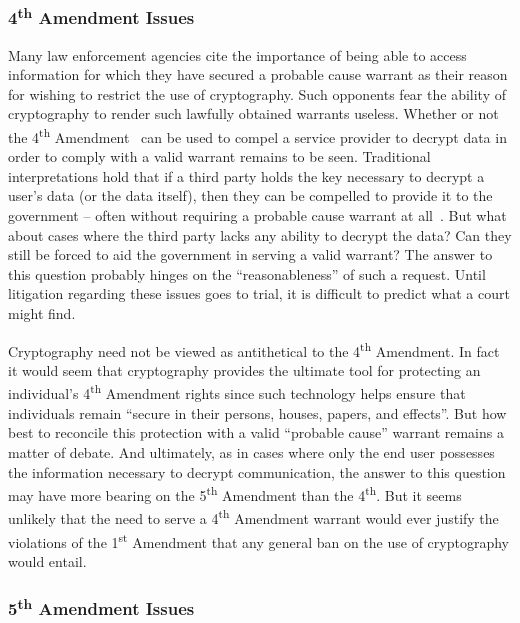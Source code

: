\subsubsection{4\textsuperscript{th} Amendment Issues}

Many law enforcement agencies cite the importance of being able to
access information for which they have secured a probable cause
warrant as their reason for wishing to restrict the use of
cryptography. Such opponents fear the ability of cryptography to
render such lawfully obtained warrants useless. Whether or not the
4\textsuperscript{th} Amendment~\cite{us-constitution-amend4} can be
used to compel a service provider to decrypt data in order to comply
with a valid warrant remains to be seen. Traditional interpretations
hold that if a third party holds the key necessary to decrypt a user's
data (or the data itself), then they can be compelled to provide it to
the government -- often without requiring a probable cause warrant at
all~\cite{thompson-thirdparty}. But what about cases where the third
party lacks any ability to decrypt the data? Can they still be forced
to aid the government in serving a valid warrant?  The answer to this
question probably hinges on the ``reasonableness'' of such a
request. Until litigation regarding these issues goes to trial, it is
difficult to predict what a court might find.

Cryptography need not be viewed as antithetical to the
4\textsuperscript{th} Amendment. In fact it would seem that
cryptography provides the ultimate tool for protecting an individual's
4\textsuperscript{th} Amendment rights since such technology helps
ensure that individuals remain ``secure in their persons, houses,
papers, and effects''. But how best to reconcile this protection with
a valid ``probable cause'' warrant remains a matter of debate. And
ultimately, as in cases where only the end user possesses the
information necessary to decrypt communication, the answer to this
question may have more bearing on the 5\textsuperscript{th} Amendment
than the 4\textsuperscript{th}. But it seems unlikely that the need to
serve a 4\textsuperscript{th} Amendment warrant would ever justify the
violations of the 1\textsuperscript{st} Amendment that any general ban
on the use of cryptography would entail.

\subsubsection{5\textsuperscript{th} Amendment Issues}


